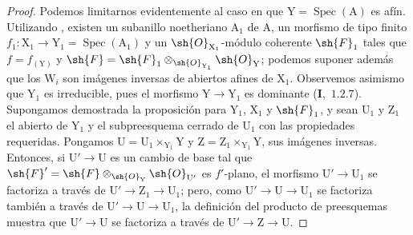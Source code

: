 \begin{proof}
Podemos limitarnos evidentemente al caso en que $\mathrm{Y}=\operatorname{Spec}(\mathrm{A})$ es afín. Utilizando
, existen un subanillo noetheriano $\mathrm{A}_1$ de $\mathrm{A}$, un morfismo de tipo finito
$f_1:\mathrm{X}_1\to\mathrm{Y}_1=\operatorname{Spec}(\mathrm{A}_1)$ y un $\sh{O}_{\mathrm{X}_1}$-módulo coherente $\sh{F}_1$ tales que $f=f_{(\mathrm{Y})}$ y $\sh{F}=\sh{F}_1\otimes_{\sh{O}_{\mathrm{Y}_1}}\sh{O}_\mathrm{Y}$;
podemos suponer además que los $\mathrm{W}_i$ son imágenes inversas de abiertos afines de $\mathrm{X}_1$.
Observemos asimismo que $\mathrm{Y}_1$ es irreducible, pues el morfismo $\mathrm{Y}\to\mathrm{Y}_1$ es dominante (\textbf{I},~$1.2.7$).
Supongamos demostrada la proposición para $\mathrm{Y}_1$, $\mathrm{X}_1$ y $\sh{F}_1$, y sean $\mathrm{U}_1$ y $\mathrm{Z}_1$ el abierto de $\mathrm{Y}_1$
y el subpreesquema cerrado de $\mathrm{U}_1$ con las propiedades requeridas. Pongamos $\mathrm{U}=\mathrm{U}_1\times_{\mathrm{Y}_1}\mathrm{Y}$ y $\mathrm{Z}=\mathrm{Z}_1\times_{\mathrm{Y}_1}\mathrm{Y}$, sus imágenes inversas. Entonces, si $\mathrm{U}'\to\mathrm{U}$ es un cambio de base
tal que $\sh{F}'=\sh{F}\otimes_{\sh{O}_\mathrm{Y}}\sh{O}_{\mathrm{U}'}$ es $f'$-plano, el morfismo $\mathrm{U}'\to\mathrm{U}_1$ se factoriza
a través de $\mathrm{U}'\to\mathrm{Z}_1\to\mathrm{U}_1$; pero, como $\mathrm{U}'\to\mathrm{U}\to\mathrm{U}_1$ se factoriza también a través de $\mathrm{U}'\to\mathrm{U}\to\mathrm{U}_1$, la definición
del producto de preesquemas muestra que $\mathrm{U}'\to\mathrm{U}$ se factoriza a través de $\mathrm{U}'\to\mathrm{Z}\to\mathrm{U}$.


\end{proof}
